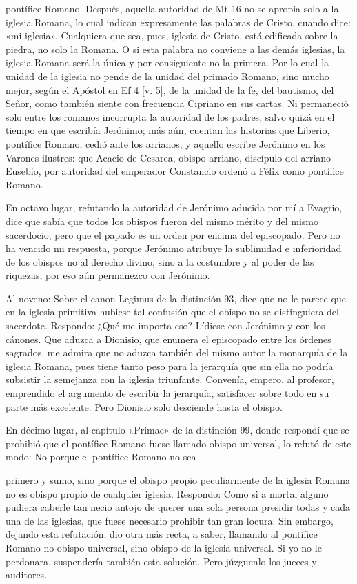 pontífice Romano. Después, aquella autoridad de Mt 16 no se apropia solo a la iglesia Romana, lo cual indican expresamente las palabras de Cristo, cuando dice: «mi iglesia». Cualquiera que sea, pues, iglesia de Cristo, está edificada sobre la piedra, no solo la Romana. O si esta palabra no conviene a las demás iglesias, la iglesia Romana será la única y por consiguiente no la primera. Por lo cual la unidad de la iglesia no pende de la unidad del primado Romano, sino mucho mejor, según el Apóstol en Ef 4 [v. 5], de la unidad de la fe, del bautismo, del Señor, como también siente con frecuencia Cipriano en sus cartas. Ni permaneció solo entre los romanos incorrupta la autoridad de los padres, salvo quizá en el tiempo en que escribía Jerónimo; más aún, cuentan las historias que Liberio, pontífice Romano, cedió ante los arrianos, y aquello escribe Jerónimo en los Varones ilustres: que Acacio de Cesarea, obispo arriano, discípulo del arriano Eusebio, por autoridad del emperador Constancio ordenó a Félix como pontífice Romano.

En octavo lugar, refutando la autoridad de Jerónimo aducida por mí a Evagrio, dice que sabía que todos los obispos fueron del mismo mérito y del mismo sacerdocio, pero que el papado es un orden por encima del episcopado. Pero no ha vencido mi respuesta, porque Jerónimo atribuye la sublimidad e inferioridad de los obispos no al derecho divino, sino a la costumbre y al poder de las riquezas; por eso aún permanezco con Jerónimo.

Al noveno: Sobre el canon Legimus de la distinción 93, dice que no le parece \marginpar{\small[267]} que en la iglesia primitiva hubiese tal confusión que el obispo no se distinguiera del sacerdote. Respondo: ¿Qué me importa eso? Lídiese con Jerónimo y con los cánones. Que aduzca a Dionisio, que enumera el episcopado entre los órdenes sagrados, me admira que no aduzca también del mismo autor la monarquía de la iglesia Romana, pues tiene tanto peso para la jerarquía que sin ella no podría subsistir la semejanza con la iglesia triunfante. Convenía, empero, al profesor, emprendido el argumento de escribir la jerarquía, satisfacer sobre todo en su parte más excelente. Pero Dionisio solo desciende hasta el obispo.

En décimo lugar, al capítulo «Primae» de la distinción 99, donde respondí que se prohibió que el pontífice Romano fuese llamado obispo universal, lo refutó de este modo: No porque el pontífice Romano no sea

primero y sumo, sino porque el obispo propio peculiarmente de la iglesia Romana no es obispo propio de cualquier iglesia. Respondo: Como si a mortal alguno pudiera caberle tan necio antojo de querer una sola persona presidir todas y cada una de las iglesias, que fuese necesario prohibir tan gran locura. Sin embargo, dejando esta refutación, dio otra más recta, a saber, llamando al pontífice Romano no obispo universal, sino obispo de la iglesia universal. Si yo no le perdonara, suspendería también esta solución. Pero júzguenlo los jueces y auditores.

